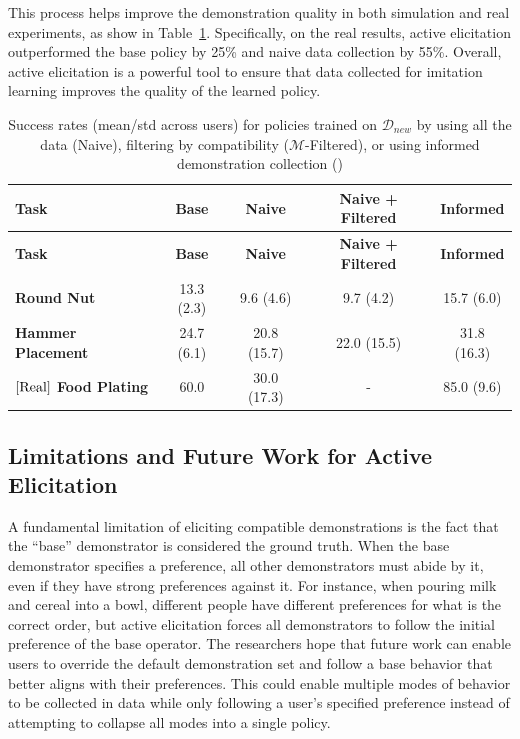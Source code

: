 \documentclass[
  letterpaper,
  numbers=noenddot,
  DIV=11,
  oneside]{scrreprt}
\theoremstyle{remark}
\begin{document}
This process helps improve the demonstration quality in both simulation
and real experiments, as show in
Table~\ref{tbl-active_elicitation_results}. Specifically, on the real
results, active elicitation outperformed the base policy by 25\% and
naive data collection by 55\%. Overall, active elicitation is a powerful
tool to ensure that data collected for imitation learning improves the
quality of the learned policy.

\begin{longtable}[]{@{}lcccc@{}}
\caption{Success rates (mean/std across users) for policies trained on
\(\mathcal{D}_{new}\) by using all the data (Naive), filtering by
compatibility (\(\mathcal{M}\)-Filtered), or using informed
demonstration collection ()}\label{tbl-active_elicitation_results}\tabularnewline
\toprule\noalign{}
\textbf{Task} & \textbf{Base} & \textbf{Naive} & \textbf{Naive +
Filtered} & \textbf{Informed} \\
\midrule\noalign{}
\endfirsthead
\toprule\noalign{}
\textbf{Task} & \textbf{Base} & \textbf{Naive} & \textbf{Naive +
Filtered} & \textbf{Informed} \\
\midrule\noalign{}
\endhead
\bottomrule\noalign{}
\endlastfoot
\textbf{Round Nut} & 13.3 (2.3) & 9.6 (4.6) & 9.7 (4.2) & 15.7 (6.0) \\
\textbf{Hammer Placement} & 24.7 (6.1) & 20.8 (15.7) & 22.0 (15.5) &
31.8 (16.3) \\
\textbf{\(\left[ \textup{Real} \right]\) Food Plating} & 60.0 & 30.0
(17.3) & - & 85.0 (9.6) \\
\end{longtable}

\subsection{Limitations and Future Work for Active
Elicitation}\label{limitations-and-future-work-for-active-elicitation}

A fundamental limitation of eliciting compatible demonstrations is the
fact that the ``base'' demonstrator is considered the ground truth. When
the base demonstrator specifies a preference, all other demonstrators
must abide by it, even if they have strong preferences against it. For
instance, when pouring milk and cereal into a bowl, different people
have different preferences for what is the correct order, but active
elicitation forces all demonstrators to follow the initial preference of
the base operator. The researchers hope that future work can enable
users to override the default demonstration set and follow a base
behavior that better aligns with their preferences. This could enable
multiple modes of behavior to be collected in data while only following
a user's specified preference instead of attempting to collapse all
modes into a single policy.
\end{document}
